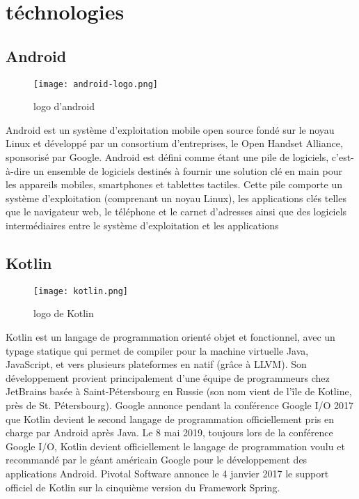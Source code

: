 \section{téchnologies}

\subsection{Android}
\begin{wrapfigure}{r}{0.25\textwidth} 
    \centering
    \texttt{[image: android-logo.png]}
    \caption{logo d'android}
\end{wrapfigure}
Android est un système d'exploitation mobile open source fondé sur le noyau Linux et développé par un consortium d'entreprises, le Open Handset Alliance, sponsorisé par Google. 
Android est défini comme étant une pile de logiciels, c'est-à-dire un ensemble de logiciels destinés à fournir une solution clé en main pour les appareils mobiles, smartphones et tablettes tactiles. Cette pile comporte un système d'exploitation (comprenant un noyau Linux), les applications clés telles que le navigateur web, le téléphone et le carnet d'adresses ainsi que des logiciels intermédiaires entre le système d'exploitation et les applications
\cite*{wiki:Android}

\subsection{Kotlin}
\begin{wrapfigure}{r}{0.25\textwidth} 
    \centering
    \texttt{[image: kotlin.png]}
    \caption{logo de Kotlin}
\end{wrapfigure}
Kotlin est un langage de programmation orienté objet et fonctionnel, avec un typage statique qui permet de compiler pour la machine virtuelle Java, JavaScript, et vers plusieurs plateformes en natif (grâce à LLVM). Son développement provient principalement d'une équipe de programmeurs chez JetBrains basée à Saint-Pétersbourg en Russie (son nom vient de l'île de Kotline, près de St. Pétersbourg).
Google annonce pendant la conférence Google I/O 2017 que Kotlin devient le second langage de programmation officiellement pris en charge par Android après Java. Le 8 mai 2019, toujours lors de la conférence Google I/O, Kotlin devient officiellement le langage de programmation voulu et recommandé par le géant américain Google pour le développement des applications Android.
Pivotal Software annonce le 4 janvier 2017 le support officiel de Kotlin sur la cinquième version du Framework Spring. 
\cite*{wiki:Kotlin}
